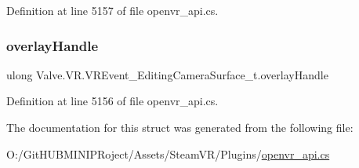 Definition at line 5157 of file openvr\+\_\+api.\+cs.

\mbox{\label{struct_valve_1_1_v_r_1_1_v_r_event___editing_camera_surface__t_a2180309cb3c6cd7d817864237b1cdcb0}} 
\subsubsection{\texorpdfstring{overlayHandle}{overlayHandle}}
{\footnotesize\ttfamily ulong Valve.\+V\+R.\+V\+R\+Event\+\_\+\+Editing\+Camera\+Surface\+\_\+t.\+overlay\+Handle}



Definition at line 5156 of file openvr\+\_\+api.\+cs.



The documentation for this struct was generated from the following file\+:\begin{DoxyCompactItemize}
\item 
O\+:/\+Git\+H\+U\+B\+M\+I\+N\+I\+P\+Roject/\+Assets/\+Steam\+V\+R/\+Plugins/\mbox{\hyperlink{openvr__api_8cs}{openvr\+\_\+api.\+cs}}\end{DoxyCompactItemize}
